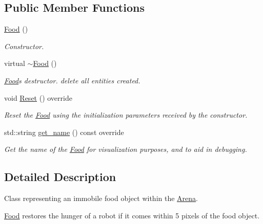 \subsection*{Public Member Functions}
\begin{DoxyCompactItemize}
\item 
\hyperlink{classFood_a75d4d7f76fd495cc8133302ca9fdc485}{Food} ()
\begin{DoxyCompactList}\small\item\em Constructor. \end{DoxyCompactList}\item 
virtual \hyperlink{classFood_a6f25dffd1fb347c982a53b9a384c611a}{$\sim$\+Food} ()\hypertarget{classFood_a6f25dffd1fb347c982a53b9a384c611a}{}\label{classFood_a6f25dffd1fb347c982a53b9a384c611a}

\begin{DoxyCompactList}\small\item\em \hyperlink{classFood}{Food}\textquotesingle{}s destructor. {\ttfamily delete} all entities created. \end{DoxyCompactList}\item 
void \hyperlink{classFood_a1a12bfd50400e04b595c24a512317c1a}{Reset} () override\hypertarget{classFood_a1a12bfd50400e04b595c24a512317c1a}{}\label{classFood_a1a12bfd50400e04b595c24a512317c1a}

\begin{DoxyCompactList}\small\item\em Reset the \hyperlink{classFood}{Food} using the initialization parameters received by the constructor. \end{DoxyCompactList}\item 
std\+::string \hyperlink{classFood_a5c3bcd5109750a15ebb24b8a2a3cdd07}{get\+\_\+name} () const override
\begin{DoxyCompactList}\small\item\em Get the name of the \hyperlink{classFood}{Food} for visualization purposes, and to aid in debugging. \end{DoxyCompactList}\end{DoxyCompactItemize}


\subsection{Detailed Description}
Class representing an immobile food object within the \hyperlink{classArena}{Arena}. 

\hyperlink{classFood}{Food} restores the hunger of a robot if it comes within 5 pixels of the food object. 

